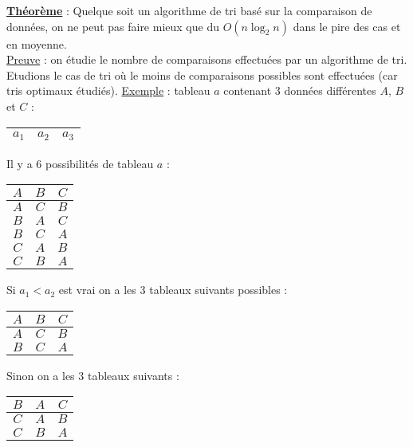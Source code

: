 \documentclass{article}
\begin{document}
\textbf{\underline{Théorème}} : Quelque soit un algorithme de tri basé sur la comparaison de données, on ne peut 
pas faire mieux que du $O(n\log_2n)$ dans le pire des cas et en moyenne. \\

\noindent\underline{Preuve} : on étudie le nombre de comparaisons effectuées par un algorithme de tri. \\

\noindent Etudions le cas de tri où le moins de comparaisons possibles sont effectuées (car tris optimaux 
étudiés). \underline{Exemple} : tableau $a$ contenant 3 données différentes $A$, $B$ et $C$ :
\begin{center}
	\begin{tabular}{|*{3}{c|}}
	\hline
	$a_1$ & $a_2$ & $a_3$ \\
	\hline
	\end{tabular}
\end{center}

Il y a 6 possibilités de tableau $a$ : 
\begin{center}
	\begin{tabular}{|*{3}{c|}}
	\hline
	$A$ & $B$ & $C$ \\
	\hline
	$A$ & $C$ & $B$ \\
	\hline
	$B$ & $A$ & $C$ \\
	\hline
	$B$ & $C$ & $A$ \\
	\hline
	$C$ & $A$ & $B$ \\
	\hline
	$C$ & $B$ & $A$ \\
	\hline
	\end{tabular}
\end{center}

Si $a_1 < a_2$ est vrai on a les 3 tableaux suivants possibles : 

\begin{center}
	\begin{tabular}{|*{3}{c|}}
	\hline
	$A$ & $B$ & $C$ \\
	\hline
	$A$ & $C$ & $B$ \\
	\hline
	$B$ & $C$ & $A$ \\
	\hline
	\end{tabular}
\end{center}

Sinon on a les 3 tableaux suivants : 

\begin{center}
	\begin{tabular}{|*{3}{c|}}
	\hline
	$B$ & $A$ & $C$ \\
	\hline
	$C$ & $A$ & $B$ \\
	\hline
	$C$ & $B$ & $A$ \\
	\hline
	\end{tabular}
\end{center}
\end{document}
